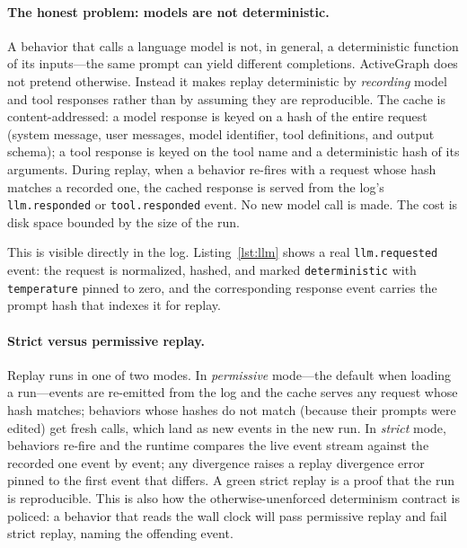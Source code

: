 \documentclass[11pt]{article}
\begin{document}
\paragraph{The honest problem: models are not deterministic.}
A behavior that calls a language model is not, in general, a deterministic function
of its inputs---the same prompt can yield different completions. ActiveGraph does
not pretend otherwise. Instead it makes replay deterministic by \emph{recording}
model and tool responses rather than by assuming they are reproducible. The cache
is content-addressed: a model response is keyed on a hash of the entire request
(system message, user messages, model identifier, tool definitions, and output
schema); a tool response is keyed on the tool name and a deterministic hash of its
arguments. During replay, when a behavior re-fires with a request whose hash
matches a recorded one, the cached response is served from the log's
\texttt{llm.responded} or \texttt{tool.responded} event. No new model call is made.
The cost is disk space bounded by the size of the run.

This is visible directly in the log. Listing~\ref{lst:llm} shows a real
\texttt{llm.requested} event: the request is normalized, hashed, and marked
\texttt{deterministic} with \texttt{temperature} pinned to zero, and the
corresponding response event carries the prompt hash that indexes it for replay.



\paragraph{Strict versus permissive replay.}
Replay runs in one of two modes. In \emph{permissive} mode---the default when
loading a run---events are re-emitted from the log and the cache serves any
request whose hash matches; behaviors whose hashes do not match (because their
prompts were edited) get fresh calls, which land as new events in the new run. In
\emph{strict} mode, behaviors re-fire and the runtime compares the live event
stream against the recorded one event by event; any divergence raises a replay
divergence error pinned to the first event that differs. A green strict replay is
a proof that the run is reproducible. This is also how the otherwise-unenforced
determinism contract is policed: a behavior that reads the wall clock will pass
permissive replay and fail strict replay, naming the offending event.
\end{document}
